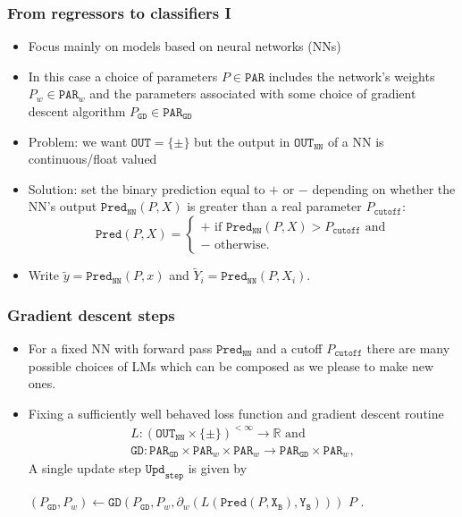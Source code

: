 \documentclass{beamer}
\newcommand{\OUT}{{\texttt{OUT}}}
\newcommand{\OUTSMOOTH}{{\texttt{OUT}_{\texttt{NN}}}}
\newcommand{\TWO}{\{\pm\}}
\newcommand{\PAR}{{\texttt{PAR}}}
\newcommand{\GD}{{\texttt{GD}}}
\newcommand{\CO}{{P_{\texttt{cutoff}}}}
\newcommand{\PRED}{{\texttt{Pred}}}
\newcommand{\PREDSMOOTH}{{\texttt{Pred}_{\texttt{NN}}}}
\newcommand{\yN}{{\tilde y}}
\newcommand{\YN}{{\tilde Y}}
\newcommand{\UPDSTEP}{{\texttt{Upd}_{\texttt{step}}}}
\newcommand{\XB}{{\texttt{X}_{\texttt{B}}}}
\newcommand{\YB}{{\texttt{Y}_{\texttt{B}}}}
\begin{document}
\begin{frame}
\frametitle{From regressors to classifiers I}
\begin{itemize}
\item
Focus mainly on models based on neural networks (NNs)
\item
In this case a choice of parameters $P\in\PAR$ includes the network's weights $P_w\in\PAR_w$ and the parameters associated with some choice of gradient descent algorithm $P_\GD\in\PAR_\GD$
\item
  Problem: we want $\OUT=\TWO$ but the output in $\OUTSMOOTH$ of a NN is continuous/float valued
\item
  Solution: set the binary prediction equal to $+$ or $-$ depending on whether the NN's output $\PREDSMOOTH(P,X)$ is greater than a real parameter $\CO$: 
$$
\PRED(P,X)=\begin{cases}+\text{ if }\PREDSMOOTH(P,X)>\CO\text{ and}\\-\text{ otherwise.}\end{cases}
$$
\item
  Write $\yN=\PREDSMOOTH(P,x)$ and $\YN_i=\PREDSMOOTH(P,X_i)$.
\end{itemize}
\end{frame}
\begin{frame}
\frametitle{Gradient descent steps}
\begin{itemize}
\item
  For a fixed NN with forward pass $\PREDSMOOTH$ and a cutoff $\CO$ there are many possible choices of LMs which can be composed as we please to make new ones.
\item
  Fixing a sufficiently well behaved loss function and gradient descent routine
    \begin{gather*}
      L:(\OUTSMOOTH\times\TWO)^{<\infty}\rightarrow\mathbb R\text{ and}\\
      \GD:\PAR_\GD\times\PAR_w\times\PAR_w\rightarrow\PAR_\GD\times\PAR_w,
    \end{gather*}
A single update step $\UPDSTEP$ is given by
\begin{algorithmic}[0]
\Function{$\UPDSTEP$}{$P,\XB,\YB$}
  \State $(P_\GD,P_w)\gets\GD(P_\GD,P_w,\partial_w(L(\PRED(P,\XB),\YB)))$
  \State\Return $P$
\EndFunction.
\end{algorithmic}
\end{itemize}
\end{frame}
\end{document}
